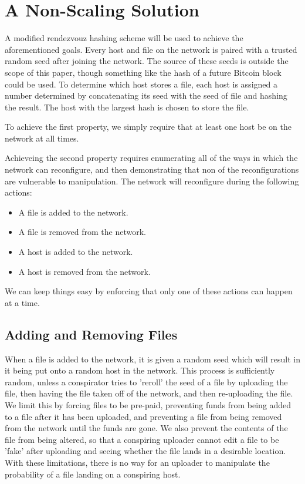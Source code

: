 \documentclass[twocolumn]{article}
\begin{document}
\section{A Non-Scaling Solution}
A modified rendezvouz hashing scheme will be used to achieve the aforementioned goals.
Every host and file on the network is paired with a trusted random seed after joining the network.
The source of these seeds is outside the scope of this paper, though something like the hash of a future Bitcoin block could be used.
To determine which host stores a file, each host is assigned a number determined by concatenating its seed with the seed of file and hashing the result.
The host with the largest hash is chosen to store the file.

To achieve the first property, we simply require that at least one host be on the network at all times.

Achieveing the second property requires enumerating all of the ways in which the network can reconfigure, and then demonstrating that non of the reconfigurations are vulnerable to manipulation.
The network will reconfigure during the following actions:
\begin{itemize}
	\item A file is added to the network.
	\item A file is removed from the network.
	\item A host is added to the network.
	\item A host is removed from the network.
\end{itemize}
We can keep things easy by enforcing that only one of these actions can happen at a time.

\subsection{Adding and Removing Files}
When a file is added to the network, it is given a random seed which will result in it being put onto a random host in the network.
This process is sufficiently random, unless a conspirator tries to 'reroll' the seed of a file by uploading the file, then having the file taken off of the network, and then re-uploading the file.
We limit this by forcing files to be pre-paid, preventing funds from being added to a file after it has been uploaded, and preventing a file from being removed from the network until the funds are gone.
We also prevent the contents of the file from being altered, so that a conspiring uploader cannot edit a file to be 'fake' after uploading and seeing whether the file lands in a desirable location.
With these limitations, there is no way for an uploader to manipulate the probability of a file landing on a conspiring host.
\end{document}
